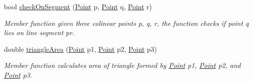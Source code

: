 \begin{DoxyCompactItemize}
bool \hyperlink{classRangerFusion_a3acbc5680a1ae726bdff3ca84ae84d09}{check\+On\+Segment} (\hyperlink{structPoint}{Point} p, \hyperlink{structPoint}{Point} q, \hyperlink{structPoint}{Point} r)
\begin{DoxyCompactList}\small\item\em Member function given three colinear points p, q, r, the function checks if point q lies on line segment \textquotesingle{}pr\textquotesingle{}. \end{DoxyCompactList}\item 
double \hyperlink{classRangerFusion_a358e04e31466f1ba5daa20d1de38ff9b}{triangle\+Area} (\hyperlink{structPoint}{Point} p1, \hyperlink{structPoint}{Point} p2, \hyperlink{structPoint}{Point} p3)
\begin{DoxyCompactList}\small\item\em Member function calculates area of triangle formed by \hyperlink{structPoint}{Point} p1, \hyperlink{structPoint}{Point} p2, and \hyperlink{structPoint}{Point} p3. \end{DoxyCompactList}\end{DoxyCompactItemize}
